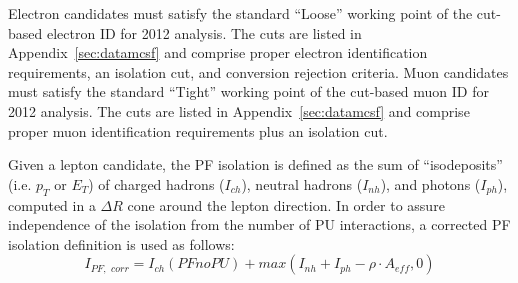 Electron candidates must satisfy the standard ``Loose'' working point of the cut-based electron ID for 2012 analysis. The cuts are listed in Appendix~\ref{sec:datamcsf} and comprise proper electron identification requirements, an isolation cut, and conversion rejection criteria. Muon candidates must satisfy the standard ``Tight'' working point of the cut-based muon ID for 2012 analysis. The cuts are listed in Appendix~\ref{sec:datamcsf} and comprise proper muon identification requirements plus an isolation cut.

Given a lepton candidate, the PF isolation is defined as the sum of ``isodeposits'' (i.e. $p_T$ or $E_T$) of charged hadrons ($I_{ch}$), neutral hadrons ($I_{nh}$), and photons ($I_{ph}$), computed in a $\Delta R$ cone around the lepton direction. In order to assure independence of the isolation from the number of PU interactions, a corrected PF isolation definition is used as follows: 
\begin{equation} I_{PF, \,\, corr} = I_{ch}(PFnoPU) + max(I_{nh}+I_{ph}- \rho \cdot A_{eff} , 0) \end{equation}

